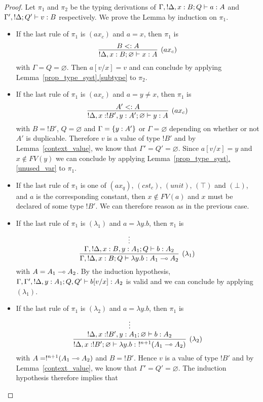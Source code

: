 \documentclass{article}
\begin{document}
\begin{proof}
Let $\pi_1$ and $\pi_2$ be the typing derivations  of 
$\Gamma,!\Delta,x:B;Q \vdash a:A$ and  $\Gamma',!\Delta;Q' \vdash v:B$ 
respectively. We prove the Lemma by induction on $\pi_1$.
\begin{itemize}
 \item If the last rule of $\pi_1$ is $(ax_c)$ and $a=x$, then $\pi_1$ is
 \[
   \infer[(ax_c)]{!\Delta, x:B;\varnothing\entails x:A}{
     B<:A
   }
 \]
 with $\Gamma=Q=\varnothing$. Then $a[v/x]=v$ and can conclude by applying 
 Lemma~\hyperref[subtype]{\ref*{prop_type_syst}.\ref*{subtype}} to $\pi_2$.
 \item If the last rule of $\pi_1$ is $(ax_c)$ and $a=y\neq x$, then 
 $\pi_1$ is
 \[
   \infer[(ax_c)]{!\Delta, x:!B',y:A';\varnothing\entails y:A}{
     A'<:A
   }
 \]
 with $B=!B'$, $Q=\varnothing$ and $\Gamma =\{y:A'\}$ or $\Gamma=\varnothing$ 
 depending on whether or not $A'$ is duplicable. Therefore $v$ is a value of 
 type $!B'$ and by Lemma~\hyperref[context_value]{\ref*{context_value}}, 
 we know that $\Gamma'=Q'=\varnothing$. Since $a[v/x]=y$ and $x\notin FV(y)$ 
 we can conclude by applying
 Lemma~\hyperref[unused_var]{\ref*{prop_type_syst}.\ref*{unused_var}} to $\pi_1$.
 \item If the last rule of $\pi_1$ is one of $(ax_q)$, $(cst_c)$, 
 $(unit)$, $(\top)$ and $(\bot)$, and $a$ is the corresponding constant, 
 then $x\notin FV(a)$ and  $x$ must be declared of some type $!B'$.
 We can therefore reason as in the previous case. 
 \item If the last rule of $\pi_1$ is $(\lambda_1)$ and $a=\lambda y.b$, then $\pi_1$ is
  \[
   \infer[(\lambda_1)]{\Gamma,!\Delta,x:B;Q\entails \lambda y.b:A_1\loli A_2}{
     \deduce[]{\Gamma, !\Delta,x:B,y:A_1;Q \entails b:A_2}{
       \vdots
     }
   }
 \]
 with $A=A_1\multimap A_2$. By the induction hypothesis, 
 $\Gamma, \Gamma',!\Delta,y:A_1;Q,Q' \vdash b[v/x]:A_2$ is valid and we can conclude
 by applying $(\lambda_1)$.
 \item If the last rule of $\pi_1$ is $(\lambda_2)$ and $a=\lambda y.b$, 
 then $\pi_1$ is
 \[
  \infer[(\lambda_2)]{!\Delta, x:!B';\varnothing \entails \lambda y.b:~!^{n+1}(A_1\loli A_2)}{
    \deduce[]{!\Delta, x:!B',y:A_1;\varnothing \entails b:A_2}{
      \vdots
    }
  }
 \]
 with $A=!^{n+1}(A_1\multimap A_2)$ and $B=!B'$. Hence $v$ is a value of type $!B'$ and  
 by Lemma~\hyperref[context_value]{\ref*{context_value}}, we know that
 $\Gamma'=Q'=\varnothing$. The induction hypothesis therefore implies that

\end{itemize}
\end{proof}
\end{document}
